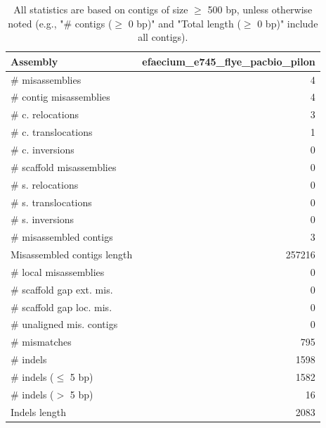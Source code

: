 \documentclass[12pt,a4paper]{article}
\begin{document}
\begin{table}[ht]
\begin{center}
\caption{All statistics are based on contigs of size $\geq$ 500 bp, unless otherwise noted (e.g., "\# contigs ($\geq$ 0 bp)" and "Total length ($\geq$ 0 bp)" include all contigs).}
\begin{tabular}{|l*{1}{|r}|}
\hline
Assembly & efaecium\_e745\_flye\_pacbio\_pilon \\ \hline
\# misassemblies & 4 \\ \hline
\hspace{2mm}\# contig misassemblies & 4 \\ \hline
\hspace{5mm}\# c. relocations & 3 \\ \hline
\hspace{5mm}\# c. translocations & 1 \\ \hline
\hspace{5mm}\# c. inversions & 0 \\ \hline
\hspace{2mm}\# scaffold misassemblies & 0 \\ \hline
\hspace{5mm}\# s. relocations & 0 \\ \hline
\hspace{5mm}\# s. translocations & 0 \\ \hline
\hspace{5mm}\# s. inversions & 0 \\ \hline
\# misassembled contigs & 3 \\ \hline
Misassembled contigs length & 257216 \\ \hline
\# local misassemblies & 0 \\ \hline
\# scaffold gap ext. mis. & 0 \\ \hline
\# scaffold gap loc. mis. & 0 \\ \hline
\# unaligned mis. contigs & 0 \\ \hline
\# mismatches & 795 \\ \hline
\# indels & 1598 \\ \hline
\hspace{5mm}\# indels ($\leq$ 5 bp) & 1582 \\ \hline
\hspace{5mm}\# indels ($>$ 5 bp) & 16 \\ \hline
Indels length & 2083 \\ \hline
\end{tabular}
\end{center}
\end{table}
\end{document}
